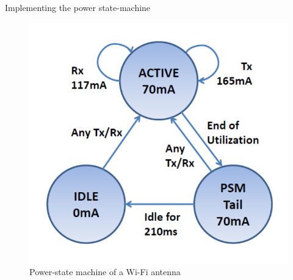 \begin{frame}{Implementing the power state-machine}
\begin{figure}
	\includegraphics[height=0.6\textheight]{figures/wifi_statemachine.png} 
	\caption{Power-state machine of a Wi-Fi antenna}
\end{figure}
\end{frame}
%
% 
